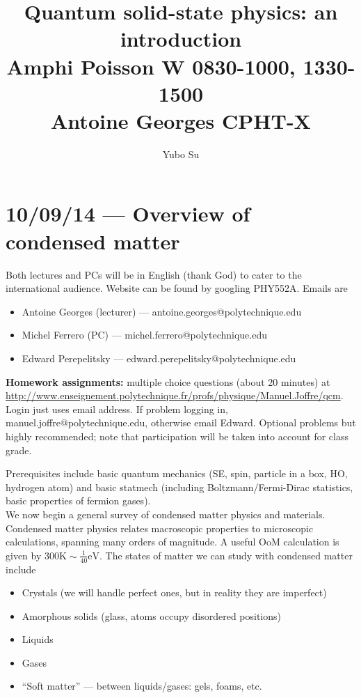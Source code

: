 \documentclass[10pt]{report}
\begin{document}
\title{Quantum solid-state physics: an introduction\\ Amphi Poisson W 0830-1000, 1330-1500\\ Antoine Georges CPHT-X}
\author{Yubo Su}
\date{}

\maketitle
\tableofcontents

\chapter{10/09/14 --- Overview of condensed matter}

Both lectures and PCs will be in English (thank God) to cater to the international audience. Website can be found by googling PHY552A. Emails are
\begin{itemize}
    \item Antoine Georges (lecturer) --- antoine.georges@polytechnique.edu
    \item Michel Ferrero (PC) --- michel.ferrero@polytechnique.edu
    \item Edward Perepelitsky --- edward.perepelitsky@polytechnique.edu
\end{itemize}

\textbf{Homework assignments:} multiple choice questions (about 20 minutes) at \url{http://www.enseignement.polytechnique.fr/profs/physique/Manuel.Joffre/qcm}. Login just uses email address. If problem logging in, manuel.joffre@polytechnique.edu, otherwise email Edward. Optional problems but highly recommended; note that participation will be taken into account for class grade.

Prerequisites include basic quantum mechanics (SE, spin, particle in a box, HO, hydrogen atom) and basic statmech (including Boltzmann/Fermi-Dirac statistics, basic properties of fermion gases). \\[10pt]

We now begin a general survey  of condensed matter physics and materials. Condensed matter physics relates macroscopic properties to microscopic calculations, spanning many orders of magnitude. A useful OoM calculation is given by $300\mathrm{K} \sim \frac{1}{40}\mathrm{eV}$. The states of matter we can study with condensed matter include
\begin{itemize}
    \item Crystals (we will handle perfect ones, but in reality they are imperfect)
    \item Amorphous solids (glass, atoms occupy disordered positions)
    \item Liquids
    \item Gases
    \item ``Soft matter'' --- between liquids/gases: gels, foams, etc.
\end{itemize}
\end{document}
